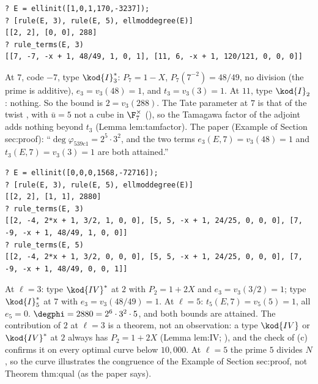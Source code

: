 \begin{sloppypar}
\begin{example}[\curve{539c1}]\label{ex:computation:539c1}
\begin{lstlisting}[language=GP]
? E = ellinit([1,0,1,170,-3237]);
? [rule(E, 3), rule(E, 5), ellmoddegree(E)]
[[2, 2], [0, 0], 288]
? rule_terms(E, 3)
[[7, -7, -x + 1, 48/49, 1, 0, 1], [11, 6, -x + 1, 120/121, 0, 0, 0]]
\end{lstlisting}
At $7$, code $-7$, type $\kod{I}_3^*$: $P_7=1-X$, $P_7(7^{-2})=48/49$, no division (the prime is additive), $e_3=v_3(48)=1$, and $t_3=v_3(3)=1$. At $11$, type $\kod{I}_2$:
nothing. So the bound is $2=v_3(288)$. The Tate parameter at $7$ is that of the twist , with $\bar u=5$ not a cube in $\F_7^\times$
(), so the Tamagawa factor of the adjoint adds nothing beyond $t_3$ (Lemma lem:tamfactor). The paper (Example of
Section sec:proof): ``$\deg\varphi_{\text{539c1}}=2^5\cdot3^2$, and the two terms $e_3(E,7)=v_3(48)=1$ and $t_3(E,7)=v_3(3)=1$ are both attained.''
\end{example}

\begin{example}[\curve{980i1}]\label{ex:computation:980i1}
\begin{lstlisting}[language=GP]
? E = ellinit([0,0,0,1568,-72716]);
? [rule(E, 3), rule(E, 5), ellmoddegree(E)]
[[2, 2], [1, 1], 2880]
? rule_terms(E, 3)
[[2, -4, 2*x + 1, 3/2, 1, 0, 0], [5, 5, -x + 1, 24/25, 0, 0, 0], [7, -9, -x + 1, 48/49, 1, 0, 0]]
? rule_terms(E, 5)
[[2, -4, 2*x + 1, 3/2, 0, 0, 0], [5, 5, -x + 1, 24/25, 0, 0, 0], [7, -9, -x + 1, 48/49, 0, 0, 1]]
\end{lstlisting}
At $\ell=3$: type $\kod{IV}^*$ at $2$ with $P_2=1+2X$ and $e_3=v_3(3/2)=1$; type $\kod{I}_5^*$ at $7$ with $e_3=v_3(48/49)=1$. At $\ell=5$: $t_5(E,7)=v_5(5)=1$, all $e_5=0$.
$\degphi=2880=2^6\cdot3^2\cdot5$, and both bounds are attained. The contribution of $2$ at $\ell=3$ is a theorem, not an observation: a type $\kod{IV}$ or
$\kod{IV}^*$ at $2$ always has $P_2=1+2X$ (Lemma lem:IV; ), and the check of (c) confirms it on every
optimal curve below $10{,}000$. At $\ell=5$ the prime $5$ divides $N$, so the curve illustrates the congruence of the Example of Section sec:proof, not
Theorem thm:qual (as the paper says).
\end{example}


\end{sloppypar}
